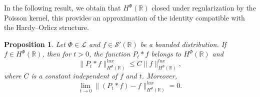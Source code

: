 \documentclass[a4paper,12pt,intlimits,oneside]{amsart}
\newtheorem{proposition}[theorem]{Proposition}
\theoremstyle{definition}
\numberwithin{equation}{section}
\theoremstyle{definition}
\begin{document}
\noindent
In the following result, we obtain that $H^{\Phi}(\mathbb{R})$ closed under regularization by the Poisson kernel, this provides an approximation of the identity compatible with the Hardy--Orlicz structure.


\begin{proposition}\label{pro:mainqaq2aop}
Let  $\Phi \in \mathscr{L}$ and $f \in \mathscr{S}'(\mathbb{R})$ be a bounded distribution. 
If $f \in H^{\Phi}(\mathbb{R})$, then for $t>0$, the function $P_{t}\ast f$ belongs to $H^{\Phi}(\mathbb{R})$ and 
\begin{equation}\label{eq:pmta2}
\|P_{t}\ast f\|_{H^{\Phi}(\mathbb{R})}^{lux} \leq C \|f\|_{H^{\Phi}(\mathbb{R})}^{lux},
\end{equation}
where $C$ is a constant independent of $f$ and $t$. Moreover,
\begin{equation}\label{eq:dqtaqa2}
\lim_{t \to 0}\|(P_{t}\ast f)-f\|_{H^{\Phi}(\mathbb{R})}^{lux}=0.
\end{equation}
\end{proposition}
\end{document}

